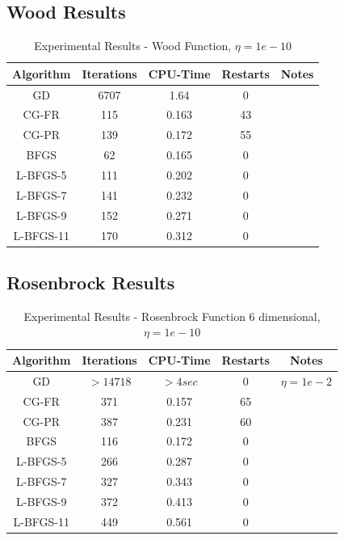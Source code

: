 \documentclass[12pt]{amsart}
\begin{document}
\subsection{Wood Results}

\begin{table}
\caption{Experimental Results - Wood Function, $\eta=1e-10$}
\label{results_table}
\begin{center}
\begin{tabular}{|c||c||c||c||c|}
\hline
Algorithm & Iterations & CPU-Time & Restarts & Notes\\
\hline
GD & 6707 & 1.64 & 0 & \\
\hline
CG-FR & 115 & 0.163 & 43 & \\
\hline
CG-PR & 139 & 0.172 & 55 & \\
\hline
BFGS & 62 & 0.165 & 0 & \\
\hline
L-BFGS-5 & 111 & 0.202 & 0 &\\
\hline
L-BFGS-7 & 141 & 0.232 & 0 &\\
\hline
L-BFGS-9 & 152 & 0.271 & 0 &\\
\hline
L-BFGS-11 & 170 & 0.312 & 0 &\\
\hline
\end{tabular}
\end{center}
\end{table}

\subsection{Rosenbrock Results}
\begin{table}
\caption{Experimental Results - Rosenbrock Function 6 dimensional, $\eta=1e-10$}
\label{results_table}
\begin{center}
\begin{tabular}{|c||c||c||c||c|}
\hline
Algorithm & Iterations & CPU-Time & Restarts & Notes\\
\hline
GD & $>14718$ & $>4sec$ & 0 & $\eta=1e-2$\\
\hline
CG-FR & 371 & 0.157 & 65 & \\
\hline
CG-PR & 387 & 0.231 & 60 & \\
\hline
BFGS & 116 & 0.172 & 0 & \\
\hline
L-BFGS-5 & 266 & 0.287 & 0 &\\
\hline
L-BFGS-7 & 327 & 0.343 & 0 &\\
\hline
L-BFGS-9 & 372 & 0.413 & 0 &\\
\hline
L-BFGS-11 & 449 & 0.561 & 0 &\\
\hline
\end{tabular}
\end{center}
\end{table}
\end{document}
